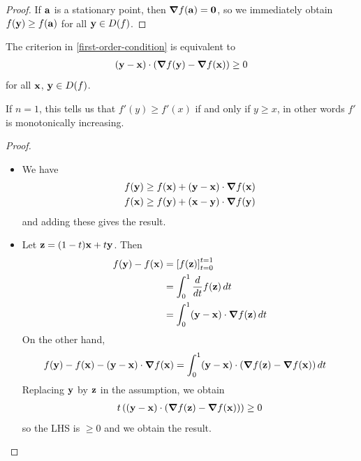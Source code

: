 \documentclass{../../template/note}
\begin{document}
    \begin{proof}
        If $\V a$ is a stationary point, then $\grad f(\V a) = \V 0$, so we immediately obtain $f(\V y) \geq f(\V a)$ for all $\V y \in D(f)$.
    \end{proof}
    
    \begin{proposition}
        \label{grad-dot-criterion}
        The criterion in \cref{first-order-condition} is equivalent to
        \begin{align*}
            (\V y - \V x) \cdot (\grad f(\V y) - \grad f(\V x)) \geq 0
        \end{align*}
        for all $\V x$, $\V y \in D(f)$.        
    \end{proposition}
    
    \begin{remark*}
        If $n=1$, this tells us that $f'(y) \geq f'(x)$ if and only if $y \geq x$, in other words $f'$ is monotonically increasing.
    \end{remark*}

    \begin{proof}
        \begin{itemize}
            \item[$\implies$] We have
            \begin{align*}
                f(\V y) &\geq f(\V x) + (\V y - \V x) \cdot \grad f(\V x) \\
                f(\V x) &\geq f(\V y) + (\V x - \V y) \cdot \grad f(\V y)
            \end{align*}
            and adding these gives the result.
            \item[$\impliedby$] Let $\V z = (1-t) \V x + t \V y$. Then
            \begin{align*}
                f(\V y) - f(\V x) &= \left[f(\V z)\right]_{t=0}^{t=1} \\
                &= \int_0^1 \frac{d}{dt} f(\V z) \D t \\
                &= \int_0^1 (\V y - \V x) \cdot \grad f(\V z) \D t
            \end{align*}
            On the other hand,
            \begin{align*}
                f(\V y) - f(\V x) - (\V y - \V x) \cdot \grad f(\V x) &= \int_0^1 (\V y - \V x) \cdot (\grad f(\V z) - \grad f(\V x)) \D t
            \end{align*}
            Replacing $\V y$ by $\V z$ in the assumption, we obtain
            \begin{align*}
                t \left((\V y - \V x) \cdot (\grad f(\V z) - \grad f(\V x))\right) \geq 0
            \end{align*}
            so the LHS is $\geq 0$ and we obtain the result.           
        \end{itemize}
    \end{proof}
    
\end{document}
